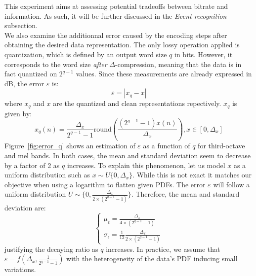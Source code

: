 \documentclass[final,3p,times,twocolumn]{elsarticle}
\begin{document}
This experiment aims at assessing potential tradeoffs between bitrate and information. As such, it will be further discussed in the \textit{Event recognition} subsection.\\

We also examine the additionnal error caused by the encoding steps after obtaining the desired data representation. The only lossy operation applied is quantization, which is defined by an output word size $q$ in bits. However, it corresponds to the word size \textit{after} $\Delta$-compression, meaning that the data is in fact quantized on $2^{q-1}$ values. Since these measurements are already expressed in dB, the error $\varepsilon$ is:
\begin{equation*}
	\varepsilon = |x_q-x|
\end{equation*}
where $x_q$ and $x$ are the quantized and clean representations repectively. $x_q$ is given by:
\begin{equation*}
x_q(n) = \frac{\Delta_x}{2^{q-1}-1}\textrm{round}\left(\frac{(2^{q-1}-1)x(n)}{\Delta_x}\right), x\in \left[0, \Delta_x\right]
\end{equation*}
Figure~\ref{fig:error_q} shows an estimation of $\varepsilon$ as a function of $q$ for third-octave and mel bands. In both cases, the mean and standard deviation seem to decrease by a factor of 2 as $q$ increases. To explain this phenomenon, let us model $x$ as a uniform distribution such as $x\sim \textit{U}\{0, \Delta_x\}$. While this is not exact it matches our objective when using a logarithm to flatten given PDFs. The error $\varepsilon$ will follow a uniform distribution $U\sim \{0, \frac{\Delta_x}{2\times (2^{q-1}-1)}\}$. Therefore, the mean and standard deviation are:
\[
\begin{cases}
	\mu_\epsilon = \frac{\Delta_x}{4\times (2^{q-1}-1)}\\
	\sigma_\epsilon = \frac{1}{12}\frac{\Delta_x}{2\times (2^{q-1}-1)}
\end{cases}
\]
justifying the decaying ratio as $q$ increases. In practice, we assume that $\varepsilon = f(\Delta_x, \frac{1}{2^{q-1}-1})$ with the heterogeneity of the data's PDF inducing small variations.\\
\end{document}
